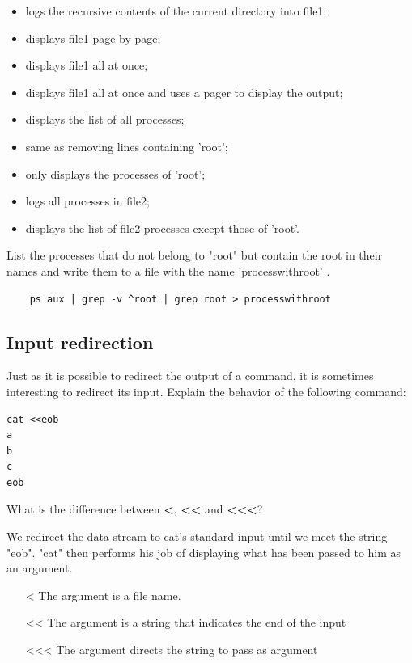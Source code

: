 \documentclass[11pt]{article}
\begin{document}
\begin{solution}
	\begin{itemize}
		\item logs the recursive contents of the current directory into file1;
		\item displays file1 page by page;
		\item displays file1 all at once;
		\item displays file1 all at once and uses a pager to display the output;
		\item displays the list of all processes;
		\item same as removing lines containing 'root';
		\item only displays the processes of 'root';
		\item logs all processes in file2;
		\item displays the list of file2 processes except those of 'root'.
	\end{itemize}
\end{solution}
\smallskip
\noindent List the processes that do not belong to "root" but contain the root in their names and write them to a file with the name 'processwithroot' .

\begin{solution}
	\begin{verbatim}
	ps aux | grep -v ^root | grep root > processwithroot
	\end{verbatim}
\end{solution}

\subsection{Input redirection}
Just as it is possible to redirect the output of a command, it is sometimes interesting to redirect its input. Explain the behavior of the following command:

\begin{lstlisting}
cat <<eob
a
b
c
eob
\end{lstlisting}
What is the difference between \textbf{<{}}, \textbf{<{}<{}} and \textbf{<{}<{}<{}}?

\begin{solution}
	We redirect the data stream to cat's standard input until we meet the string "eob". "cat" then performs his job of displaying what has been passed to him as an argument.
	\begin{itemize}
		\item[<] The argument is a file name.
		\item[<{}<{}] The argument is a string that indicates the end of the input
		\item[<{}<{}<{}] The argument directs the string to pass as argument
	\end{itemize}
\end{solution}
\end{document}

